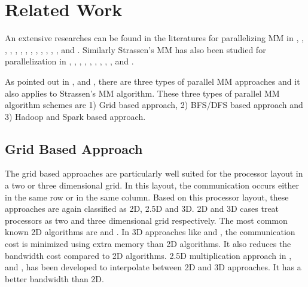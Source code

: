 \section{Related Work}
\label{sec:related-work}
An extensive researches can be found in the literatures for parallelizing MM in \cite{cannon1969cellular}, \cite{berntsen1989communication}, \cite{choi1994pumma}, \cite{agarwal1995three}, \cite{van1997summa}, \cite{gu2015efficient}, \cite{choi1992scalapack}, \cite{dumitrescu1994fast}, \cite{mccoll1999memory}, \cite{hunold2008combining}, \cite{seo2010hama}, \cite{ballard2012graph}, \cite{solomonik2011communication}, \cite{demmel2013communication} and \cite{solomonik2012matrix}. Similarly Strassen's MM has also been studied for parallelization in \cite{kumar1995tensor}, \cite{douglas1994gemmw}, \cite{grayson1996high}, \cite{luo1995scalable}, \cite{mccoll1999memory}, \cite{thottethodi1998tuning}, \cite{desprez2004impact}, \cite{ohtaki2004parallel}, \cite{song2006experiments}, \cite{lipshitz2012communication} and \cite{ballard2012communication}.

As pointed out in \cite{gu2015efficient}, \cite{demmel2013communication} and \cite{lipshitz2012communication}, there are three types of parallel MM approaches and it also applies to Strassen's MM algorithm. These three types of parallel MM algorithm schemes are 1) Grid based approach, 2) BFS/DFS based approach and 3) Hadoop and Spark based approach.

\subsection{Grid Based Approach}
The grid based approaches are particularly well suited for the processor layout in a two or three dimensional grid. In this layout, the communication occurs either in the same row or in the same column. Based on this processor layout, these approaches are again classified as 2D, 2.5D and 3D. 2D and 3D cases treat processors as two and three dimensional grid respectively. The most common known 2D algorithms are \cite{cannon1969cellular} and \cite{van1997summa}. In 3D approaches like \cite{agarwal1995three} and \cite{berntsen1989communication}, the communication cost is minimized using extra memory than 2D algorithms. It also reduces the bandwidth cost compared to 2D algorithms. 2.5D multiplication approach in \cite{solomonik2011improving}, \cite{solomonik2011communication} and \cite{mccoll1995bsp}, has been developed to interpolate between 2D and 3D approaches. It has a better bandwidth than 2D.

